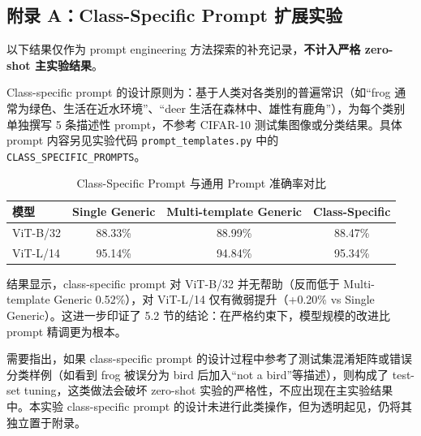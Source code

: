 \documentclass[12pt,a4paper]{ctexart}
\begin{document}
\subsection*{附录 A：Class-Specific Prompt 扩展实验}

以下结果仅作为 prompt engineering 方法探索的补充记录，\textbf{不计入严格 zero-shot 主实验结果}。

Class-specific prompt 的设计原则为：基于人类对各类别的普遍常识（如“frog 通常为绿色、生活在近水环境”、“deer 生活在森林中、雄性有鹿角”），为每个类别单独撰写 5 条描述性 prompt，不参考 CIFAR-10 测试集图像或分类结果。具体 prompt 内容另见实验代码 \texttt{prompt\_templates.py} 中的 \texttt{CLASS\_SPECIFIC\_PROMPTS}。

\begin{table}[H]
\centering
\caption{Class-Specific Prompt 与通用 Prompt 准确率对比}
\begin{tabular}{lccc}
\toprule
模型 & Single Generic & Multi-template Generic & Class-Specific \\
\midrule
ViT-B/32 & 88.33\% & 88.99\% & 88.47\% \\
ViT-L/14 & 95.14\% & 94.84\% & 95.34\% \\
\bottomrule
\end{tabular}
\end{table}

结果显示，class-specific prompt 对 ViT-B/32 并无帮助（反而低于 Multi-template Generic 0.52\%），对 ViT-L/14 仅有微弱提升（+0.20\% vs Single Generic）。这进一步印证了 5.2 节的结论：在严格约束下，模型规模的改进比 prompt 精调更为根本。

需要指出，如果 class-specific prompt 的设计过程中参考了测试集混淆矩阵或错误分类样例（如看到 frog 被误分为 bird 后加入“not a bird”等描述），则构成了 test-set tuning，这类做法会破坏 zero-shot 实验的严格性，不应出现在主实验结果中。本实验 class-specific prompt 的设计未进行此类操作，但为透明起见，仍将其独立置于附录。
\end{document}
